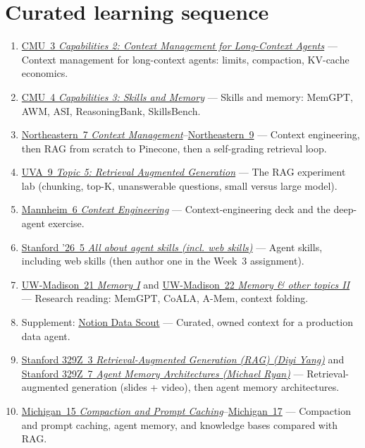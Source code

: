\documentclass[10pt,oneside]{report}
\begin{document}
\section{Curated learning sequence}
\begin{enumerate}
\item \hyperlink{lec-CMU-3}{CMU~3 \emph{Capabilities 2: Context Management for Long-Context Agents}} --- Context management for long-context agents: limits, compaction, KV-cache economics.
\item \hyperlink{lec-CMU-4}{CMU~4 \emph{Capabilities 3: Skills and Memory}} --- Skills and memory: MemGPT, AWM, ASI, ReasoningBank, SkillsBench.
\item \hyperlink{lec-NEU-7}{Northeastern~7 \emph{Context Management}}--\hyperlink{lec-NEU-9}{Northeastern~9} --- Context engineering, then RAG from scratch to Pinecone, then a self-grading retrieval loop.
\item \hyperlink{lec-UVA-9}{UVA~9 \emph{Topic 5: Retrieval Augmented Generation}} --- The RAG experiment lab (chunking, top-K, unanswerable questions, small versus large model).
\item \hyperlink{lec-MANN-6}{Mannheim~6 \emph{Context Engineering}} --- Context-engineering deck and the deep-agent exercise.
\item \hyperlink{lec-STAN26-5}{Stanford '26~5 \emph{All about agent skills (incl. web skills)}} --- Agent skills, including web skills (then author one in the Week~3 assignment).
\item \hyperlink{lec-UW-21}{UW-Madison~21 \emph{Memory I}} and \hyperlink{lec-UW-22}{UW-Madison~22 \emph{Memory \& other topics II}} --- Research reading: MemGPT, CoALA, A-Mem, context folding.
\item Supplement: \hyperref[sup-notion]{Notion Data Scout} --- Curated, owned context for a production data agent.
\item \hyperlink{lec-S329Z-3}{Stanford 329Z~3 \emph{Retrieval-Augmented Generation (RAG) (Diyi Yang)}} and \hyperlink{lec-S329Z-7}{Stanford 329Z~7 \emph{Agent Memory Architectures (Michael Ryan)}} --- Retrieval-augmented generation (slides + video), then agent memory architectures.
\item \hyperlink{lec-UMICH-15}{Michigan~15 \emph{Compaction and Prompt Caching}}--\hyperlink{lec-UMICH-17}{Michigan~17} --- Compaction and prompt caching, agent memory, and knowledge bases compared with RAG.
\end{enumerate}
\end{document}
